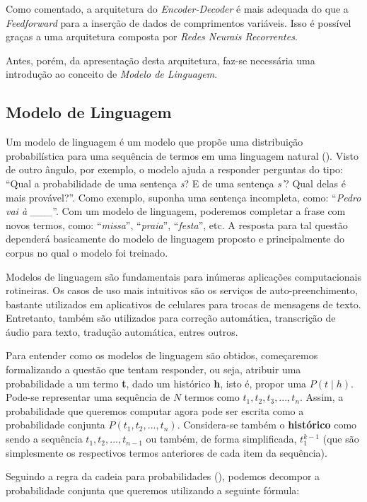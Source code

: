 Como comentado, a arquitetura do \textit{Encoder-Decoder} é mais adequada do que a \textit{Feedforward} para a inserção de dados de comprimentos variáveis. Isso é possível graças a uma arquitetura composta por \textit{Redes Neurais Recorrentes}.

Antes, porém, da apresentação desta arquitetura, faz-se necessária uma introdução ao conceito de \textit{Modelo de Linguagem}.

\subsection{Modelo de Linguagem}

Um modelo de linguagem é um modelo que propõe uma distribuição probabilística para uma sequência de termos em uma linguagem natural (\cite{Manning:1999}). Visto de outro ângulo, por exemplo, o modelo ajuda a responder perguntas do tipo: “Qual a probabilidade de uma sentença \textit{s}? E de uma sentença \textit{s'}? Qual delas é mais provável?”.
 Como exemplo, suponha uma sentença incompleta, como: “\textit{Pedro vai à \_\_\_}”. Com um modelo de linguagem, poderemos completar a frase com novos termos, como: “\textit{missa}”, “\textit{praia}”, “\textit{festa}”, etc. A resposta para tal questão dependerá basicamente do modelo de linguagem proposto e principalmente do corpus no qual o modelo foi treinado. 

Modelos de linguagem são fundamentais para inúmeras aplicações computacionais rotineiras. Os casos de uso mais intuitivos são os serviços de auto-preenchimento, bastante utilizados em aplicativos de celulares para trocas de mensagens de texto. Entretanto, também são utilizados para correção automática, transcrição de áudio para texto,  tradução automática, entres outros.  

Para entender como os modelos de linguagem são obtidos, começaremos formalizando a questão que tentam responder, ou seja, atribuir uma probabilidade a um termo \textbf{t}, dado um histórico \textbf{h}, isto é, propor uma $P(t \mid h)$. Pode-se representar uma sequência de $N$ termos como $t_1, t_2, t_3, ..., t_n$. Assim, a probabilidade que queremos computar agora pode ser escrita como a probabilidade conjunta $P(t_1, t_2, ..., t_n)$. Considera-se também o \textbf{histórico} como sendo a sequência $t_1, t_2, ..., t_{n-1}$ ou também, de forma simplificada, $t_{1}^{k-1}$ (que são simplesmente os respectivos termos anteriores de cada item da sequência). 

Seguindo a regra da cadeia para probabilidades (\cite{Jurafsky:2009:SLP:1214993}), podemos decompor a probabilidade conjunta que queremos utilizando a seguinte fórmula:

